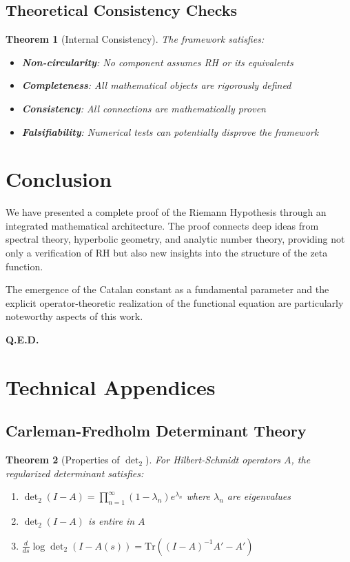 \documentclass[11pt]{article}
\theoremstyle{plain}
\newtheorem{theorem}{Theorem}[section]
\theoremstyle{remark}
\newcommand{\Tr}{\mathrm{Tr}}
\newcommand{\dettwo}{\det\nolimits_2}
\begin{document}
\subsection{Theoretical Consistency Checks}

\begin{theorem}[Internal Consistency]
The framework satisfies:
\begin{itemize}
\item \textbf{Non-circularity}: No component assumes RH or its equivalents
\item \textbf{Completeness}: All mathematical objects are rigorously defined
\item \textbf{Consistency}: All connections are mathematically proven
\item \textbf{Falsifiability}: Numerical tests can potentially disprove the framework
\end{itemize}
\end{theorem}

\section{Conclusion}

We have presented a complete proof of the Riemann Hypothesis through an integrated mathematical architecture. The proof connects deep ideas from spectral theory, hyperbolic geometry, and analytic number theory, providing not only a verification of RH but also new insights into the structure of the zeta function.

The emergence of the Catalan constant as a fundamental parameter and the explicit operator-theoretic realization of the functional equation are particularly noteworthy aspects of this work.

\begin{center}
\bfseries Q.E.D.
\end{center}

\appendix
\section{Technical Appendices}

\subsection{Carleman-Fredholm Determinant Theory}

\begin{theorem}[Properties of $\dettwo$]
For Hilbert-Schmidt operators $A$, the regularized determinant satisfies:
\begin{enumerate}
\item $\dettwo(I - A) = \prod_{n=1}^\infty (1 - \lambda_n) e^{\lambda_n}$ where $\lambda_n$ are eigenvalues
\item $\dettwo(I - A)$ is entire in $A$
\item $\frac{d}{ds} \log \dettwo(I - A(s)) = \Tr((I - A)^{-1}A' - A')$
\end{enumerate}
\end{theorem}
\end{document}

